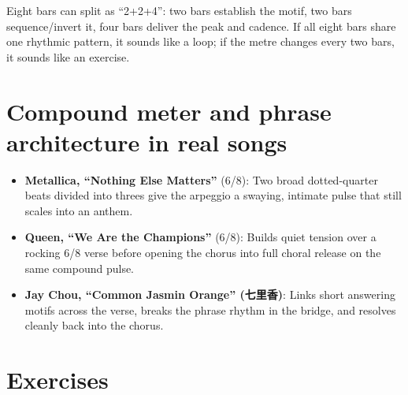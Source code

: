 Eight bars can split as ``2+2+4'': two bars establish the motif, two bars sequence/invert it, four bars deliver the peak and cadence. If all eight bars share one rhythmic pattern, it sounds like a loop; if the metre changes every two bars, it sounds like an exercise.

\section{Compound meter and phrase architecture in real songs}

\begin{itemize}
  \item \textbf{Metallica, ``Nothing Else Matters''} (6/8): Two broad dotted-quarter beats divided into threes give the arpeggio a swaying, intimate pulse that still scales into an anthem.
  \item \textbf{Queen, ``We Are the Champions''} (6/8): Builds quiet tension over a rocking 6/8 verse before opening the chorus into full choral release on the same compound pulse.
  \item \textbf{Jay Chou, ``Common Jasmin Orange'' (七里香)}: Links short answering motifs across the verse, breaks the phrase rhythm in the bridge, and resolves cleanly back into the chorus.
\end{itemize}

\section{Exercises}

